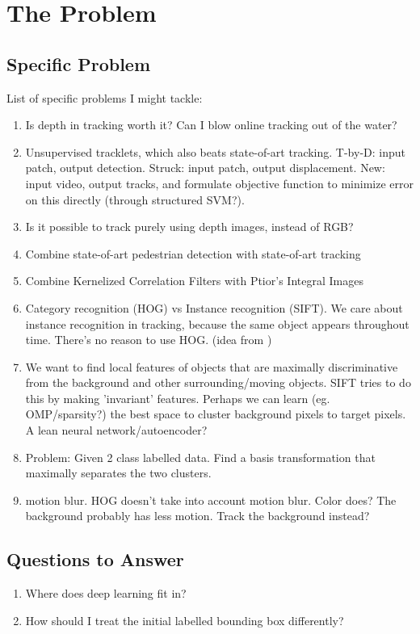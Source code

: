 \chapter{The Problem}



\section{Specific Problem}
List of specific problems I might tackle:
\begin{enumerate}
\item Is depth in tracking worth it? Can I blow online tracking out of the water?
\item Unsupervised tracklets, which also beats state-of-art tracking. T-by-D: input patch, output detection. Struck: input patch, output displacement. New: input video, output tracks, and formulate objective function to minimize error on this directly (through structured SVM?).
\item Is it possible to track purely using depth images, instead of RGB?
\item Combine state-of-art pedestrian detection with state-of-art tracking
\item Combine Kernelized Correlation Filters with Ptior's Integral Images
\item Category recognition (HOG) vs Instance recognition (SIFT). We care about instance recognition in tracking, because the same object appears throughout time. There's no reason to use HOG. (idea from \cite{breitenstein2009robust})
\item We want to find local features of objects that are maximally discriminative from the background and other surrounding/moving objects. SIFT tries to do this by making 'invariant' features. Perhaps we can learn (eg. OMP/sparsity?) the best space to cluster background pixels to target pixels. A lean neural network/autoencoder?
\item Problem: Given 2 class labelled data. Find a basis transformation that maximally separates the two clusters.
\item motion blur. HOG doesn't take into account motion blur. Color does? The background probably has less motion. Track the background instead?
\end{enumerate}

\section{Questions to Answer}
\begin{enumerate}
\item Where does deep learning fit in?
\item How should I treat the initial labelled bounding box differently?
\end{enumerate}

